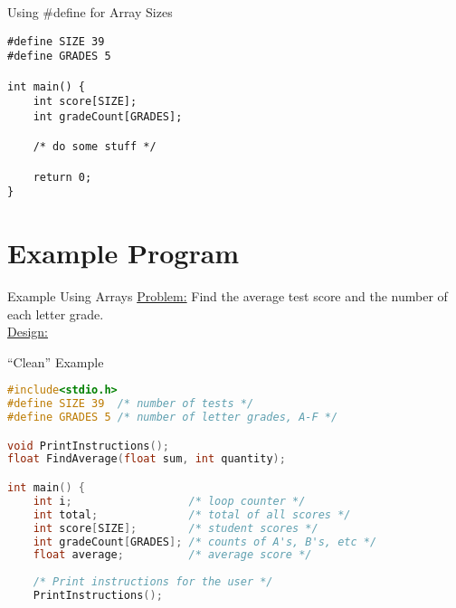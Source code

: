 \documentclass[graphics]{beamer}
\begin{document}
\begin{frame}[fragile]{Using \#define for Array Sizes}
    \begin{verbatim}
#define SIZE 39
#define GRADES 5

int main() {
    int score[SIZE];
    int gradeCount[GRADES];
    
    /* do some stuff */
    
    return 0;
}
    \end{verbatim}
\end{frame}

\section{Example Program}
\begin{frame}{Example Using Arrays}
    \underline{Problem:} Find the average test score and the number of each letter grade. \\
    \underline{Design:} \\
    \centering
\end{frame}

\begin{frame}[fragile]{``Clean'' Example}
    \begin{lstlisting}[language=C,basicstyle=\footnotesize,keywordstyle=\color{blue},commentstyle=\color{green},showstringspaces=false,stringstyle=\color{red}]
#include<stdio.h>
#define SIZE 39  /* number of tests */
#define GRADES 5 /* number of letter grades, A-F */

void PrintInstructions();
float FindAverage(float sum, int quantity);

int main() {
    int i;                  /* loop counter */
    int total;              /* total of all scores */
    int score[SIZE];        /* student scores */
    int gradeCount[GRADES]; /* counts of A's, B's, etc */
    float average;          /* average score */
    
    /* Print instructions for the user */
    PrintInstructions();
    \end{lstlisting}
\end{frame}
\end{document}
